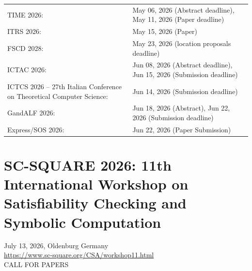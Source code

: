 \documentclass[prodmode,acmtecs]{acmsmall} %
\begin{document}
\begin{tabulary}{\linewidth}{LL}
TIME 2026:  & May 06, 2026 (Abstract  deadline), May 11, 2026 (Paper  deadline) \\
ITRS 2026:  & May 15, 2026 (Paper) \\
FSCD 2028:  & May 23, 2026 (location proposals deadline) \\
ICTAC 2026:  & Jun 08, 2026 (Abstract deadline), Jun 15, 2026 (Submission deadline) \\
ICTCS 2026 – 27th Italian Conference on Theoretical Computer Science:  & Jun 14, 2026 (Submission deadline) \\
GandALF 2026:  & Jun 18, 2026 (Abstract), Jun 22, 2026 (Submission deadline) \\
Express/SOS 2026:  & Jun 22, 2026 (Paper Submission) \\
\end{tabulary}
\section{SC-SQUARE 2026: 11th International Workshop on Satisfiability Checking and Symbolic Computation}\label{SCSQUARE2026}  July 13, 2026, Oldenburg Germany\\ 
  \href{https://www.sc-square.org/CSA/workshop11.html}{https://www.sc-square.org/CSA/workshop11.html}\\ 
CALL FOR PAPERS 
\end{document}
